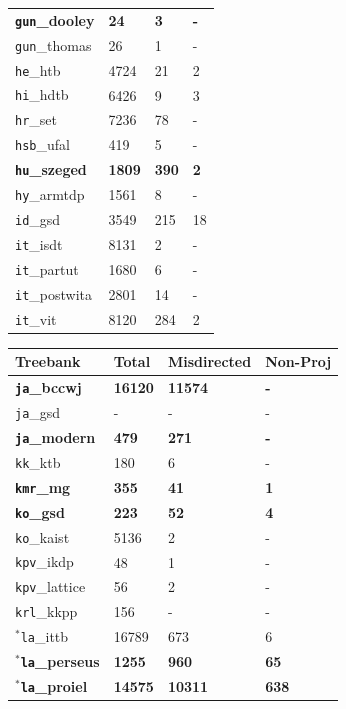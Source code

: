 \begin{table}[H]
{\begin{tabular}{|l|l|l|l|}
\textbf{\texttt{gun}\_dooley} & \textbf{24} & \textbf{3} & \textbf{-}\\
\texttt{gun}\_thomas & 26 & 1 & -\\
\texttt{he}\_htb & 4724 & 21 & 2\\
\texttt{hi}\_hdtb & 6426 & 9 & 3\\
\texttt{hr}\_set & 7236 & 78 & -\\
\texttt{hsb}\_ufal & 419 & 5 & -\\
\textbf{\texttt{hu}\_szeged} & \textbf{1809} & \textbf{390} & \textbf{2}\\
\texttt{hy}\_armtdp & 1561 & 8 & -\\
\texttt{id}\_gsd & 3549 & 215 & 18\\
\texttt{it}\_isdt & 8131 & 2 & -\\
\texttt{it}\_partut & 1680 & 6 & -\\
\texttt{it}\_postwita & 2801 & 14 & -\\
\texttt{it}\_vit & 8120 & 284 & 2\\
\hline
\end{tabular}
\hspace{4mm}
\begin{tabular}{|l|l|l|l|}
\hline
\textbf{Treebank} & \textbf{Total} & \textbf{Misdirected} & \textbf{Non-Proj}\\
\hline
\textbf{\texttt{ja}\_bccwj} & \textbf{16120} & \textbf{11574} & \textbf{-}\\
\texttt{ja}\_gsd & - & - & -\\
\textbf{\texttt{ja}\_modern} & \textbf{479} & \textbf{271} & \textbf{-}\\
\texttt{kk}\_ktb & 180 & 6 & -\\
\textbf{\texttt{kmr}\_mg} & \textbf{355} & \textbf{41} & \textbf{1}\\
\textbf{\texttt{ko}\_gsd} & \textbf{223} & \textbf{52} & \textbf{4}\\
\texttt{ko}\_kaist & 5136 & 2 & -\\
\texttt{kpv}\_ikdp & 48 & 1 & -\\
\texttt{kpv}\_lattice & 56 & 2 & -\\
\texttt{krl}\_kkpp & 156 & - & -\\
\(^{*}\)\texttt{la}\_ittb & 16789 & 673 & 6\\
\(^{*}\)\textbf{\texttt{la}\_perseus} & \textbf{1255} & \textbf{960} & \textbf{65}\\
\(^{*}\)\textbf{\texttt{la}\_proiel} & \textbf{14575} & \textbf{10311} & \textbf{638}\\

\end{tabular}}
\end{table}
